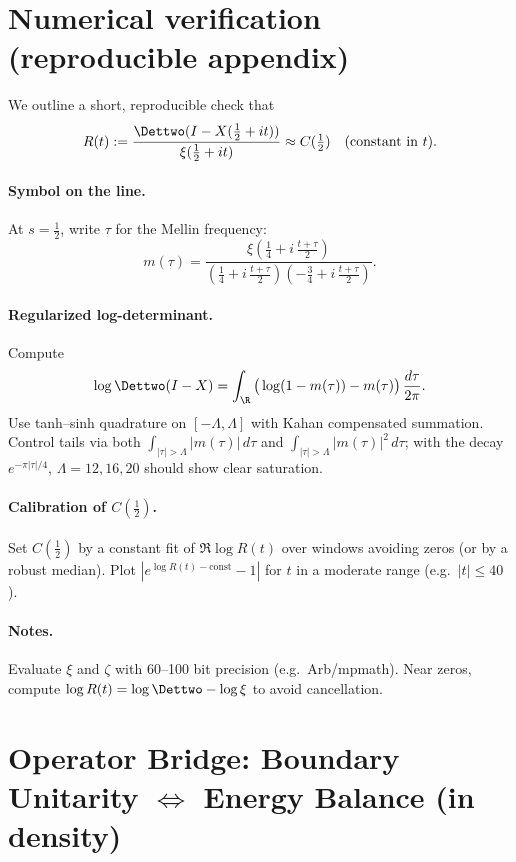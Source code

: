 \section{Numerical verification (reproducible appendix)}\label{sec:Numerics}

We outline a short, reproducible check that
\[
R(t):=\frac{\Dettwo(I-X(\tfrac12+it))}{\xi(\tfrac12+it)}\approx C(\tfrac12)\quad\text{(constant in \(t\))}.
\]

\paragraph{Symbol on the line.}
At \(s=\tfrac12\), write \(\tau\) for the Mellin frequency:
\[
m(\tau)=\frac{\xi\!\left(\tfrac14+i\,\frac{t+\tau}{2}\right)}
{ \left(\tfrac14+i\,\frac{t+\tau}{2}\right)\left(-\tfrac34+i\,\frac{t+\tau}{2}\right)}.
\]

\paragraph{Regularized log-determinant.}
Compute
\[
\log \Dettwo(I-X)=\int_{\R}\big(\log(1-m(\tau)) - m(\tau)\big)\,\frac{d\tau}{2\pi}.
\]
Use tanh–sinh quadrature on \([-\Lambda,\Lambda]\) with Kahan compensated summation. Control tails via both
\(\int_{|\tau|>\Lambda}|m(\tau)|\,d\tau\) and \(\int_{|\tau|>\Lambda}|m(\tau)|^2\,d\tau\); with the decay \(e^{-\pi|\tau|/4}\), \(\Lambda=12,16,20\) should show clear saturation.

\paragraph{Calibration of \(C(\tfrac12)\).}
Set \(C(\tfrac12)\) by a constant fit of \(\Re \log R(t)\) over windows avoiding zeros (or by a robust median). Plot \(|e^{\log R(t)-\mathrm{const}}-1|\) for \(t\) in a moderate range (e.g.\ \(|t|\le 40\)).

\paragraph{Notes.}
Evaluate \(\xi\) and \(\zeta\) with 60–100 bit precision (e.g.\ Arb/mpmath). Near zeros, compute \(\log R(t)=\log\Dettwo - \log\xi\) to avoid cancellation.

\section{Operator Bridge: Boundary Unitarity $\Longleftrightarrow$ Energy Balance (in density)}
\label{sec:operator-bridge}

